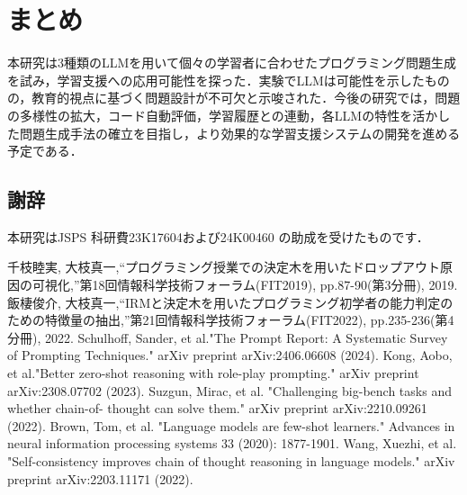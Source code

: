 \documentclass[twocolumn, fleqn, uplatex]{jsarticle}
\begin{document}
\section{まとめ}
本研究は3種類のLLMを用いて個々の学習者に合わせたプログラミング問題生成を試み，学習支援への応用可能性を探った．実験でLLMは可能性を示したものの，教育的視点に基づく問題設計が不可欠と示唆された．今後の研究では，問題の多様性の拡大，コード自動評価，学習履歴との連動，各LLMの特性を活かした問題生成手法の確立を目指し，より効果的な学習支援システムの開発を進める予定である．

\subsection*{謝辞}
本研究はJSPS 科研費23K17604および24K00460 の助成を受けたものです．

\begin{thebibliography}{9}
  \renewcommand{\baselinestretch}{1.0}
  千枝睦実, 大枝真一,“プログラミング授業での決定木を用いたドロップアウト原因の可視化,”第18回情報科学技術フォーラム(FIT2019), pp.87-90(第3分冊), 2019.
  飯棲俊介, 大枝真一,“IRMと決定木を用いたプログラミング初学者の能力判定のための特徴量の抽出,”第21回情報科学技術フォーラム(FIT2022), pp.235-236(第4分冊), 2022.
  Schulhoff, Sander, et al."The Prompt Report: A Systematic Survey of Prompting Techniques." arXiv preprint arXiv:2406.06608 (2024).
  Kong, Aobo, et al."Better zero-shot reasoning with role-play prompting." arXiv preprint arXiv:2308.07702 (2023).
  Suzgun, Mirac, et al. "Challenging big-bench tasks and whether chain-of- thought can solve them." arXiv preprint arXiv:2210.09261 (2022).
  Brown, Tom, et al. "Language models are few-shot learners." Advances in neural information processing systems 33 (2020): 1877-1901.
   Wang, Xuezhi, et al. "Self-consistency improves chain of thought reasoning in language models." arXiv preprint arXiv:2203.11171 (2022).

  
\end{thebibliography}
\end{document}
